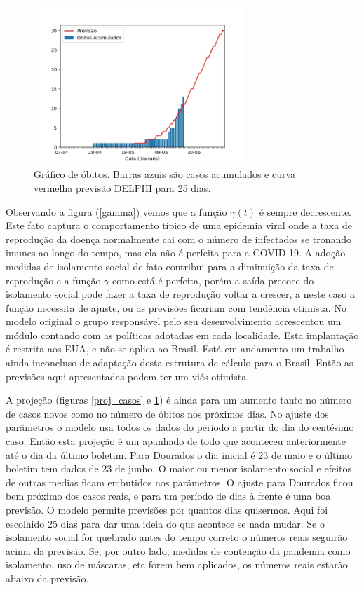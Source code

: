 \documentclass[12pt]{article}
\begin{document}
\begin{figure}[t]
 \centering
 \includegraphics[width=8cm]{figs/Fig_Brasil_MS_Dourados_obitos_20200624_025dias.jpg}
 \caption{Gráfico de óbitos. Barras azuis são casos acumulados e curva vermelha previsão DELPHI para 25 dias.}
 \label{proj_obitos}
\end{figure}


Observando a figura (\ref{gamma}) vemos que a função $\gamma(t)$ é sempre decrescente. Este fato captura o comportamento típico de uma epidemia viral onde a taxa de reprodução da doença normalmente cai com o número de infectados se tronando imunes ao longo do tempo, mas ela não é perfeita para a COVID-19. A adoção medidas de isolamento social de fato contribui para a diminuição da taxa de reprodução e a função $\gamma$ como está é perfeita, porém a saída precoce do isolamento social pode fazer a taxa de reprodução voltar a crescer, a neste caso a função necessita de ajuste, ou as previsões ficariam com tendência otimista. No modelo original o grupo responsável pelo seu desenvolvimento acrescentou um módulo contando com as políticas adotadas em cada localidade. Esta implantação é restrita aos EUA, e não se aplica ao Brasil. Está em andamento um trabalho ainda inconcluso de adaptação desta estrutura de cálculo para o Brasil. Então as previsões aqui apresentadas podem ter um viés otimista. 



A projeção (figuras \ref{proj_casos} e \ref{proj_obitos}) é ainda para um aumento tanto no número de casos novos como no número de óbitos nos próximos dias. No ajuste dos parâmetros o modelo usa todos os dados do período a partir do dia do centésimo caso. Então esta projeção é um apanhado de todo que aconteceu anteriormente até o dia da último boletim. Para Dourados o dia inicial é 23 de maio e o último boletim tem dados de 23 de junho. 
O maior ou menor isolamento social e efeitos de outras medias ficam embutidos nos parâmetros. O ajuste para Dourados ficou bem próximo dos casos reais, e para um período de dias à frente é uma boa previsão. O modelo permite previsões por quantos dias quisermos. Aqui foi escolhido 25 dias para dar uma ideia do que acontece se nada mudar. Se o isolamento social for quebrado antes do tempo correto o números reais seguirão acima da previsão. Se, por outro lado, medidas de contenção da pandemia como isolamento, uso de máscaras, etc forem bem aplicados, os números reais estarão abaixo da previsão. 
 
\end{document}

